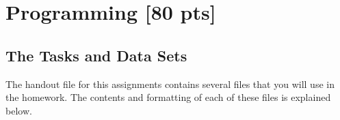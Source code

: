\documentclass{article}
\begin{document}
\begin{tcolorbox}[fit,height=10cm, width=17cm, blank, borderline={1pt}{-2pt}]
    \end{tcolorbox}

\clearpage

\section{Programming [80 pts]}
\label{programming}

\subsection{The Tasks and Data Sets}\label{dataset}
The handout file for this assignments contains several files that you will use in the homework. The contents and formatting of each of these files is explained below.
\end{document}
